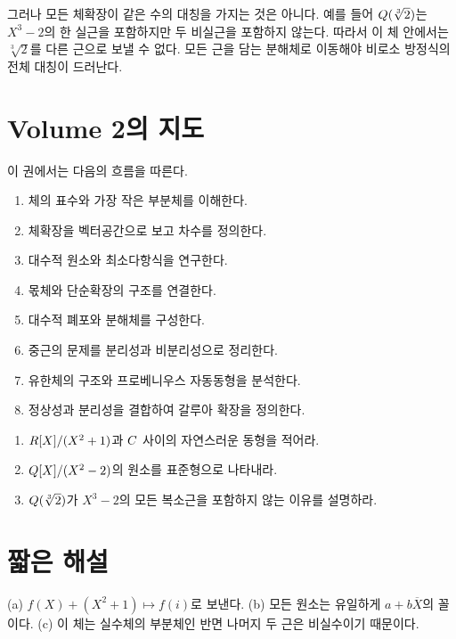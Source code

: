그러나 모든 체확장이 같은 수의 대칭을 가지는 것은 아니다. 예를 들어 $Q(\sqrt[3]{2})$는 $X^3-2$의 한 실근을 포함하지만 두 비실근을 포함하지 않는다. 따라서 이 체 안에서는 $\sqrt[3]{2}$를 다른 근으로 보낼 수 없다. 모든 근을 담는 분해체로 이동해야 비로소 방정식의 전체 대칭이 드러난다.

\section{Volume 2의 지도}

이 권에서는 다음의 흐름을 따른다.

\begin{enumerate}
  \item 체의 표수와 가장 작은 부분체를 이해한다.
  \item 체확장을 벡터공간으로 보고 차수를 정의한다.
  \item 대수적 원소와 최소다항식을 연구한다.
  \item 몫체와 단순확장의 구조를 연결한다.
  \item 대수적 폐포와 분해체를 구성한다.
  \item 중근의 문제를 분리성과 비분리성으로 정리한다.
  \item 유한체의 구조와 프로베니우스 자동동형을 분석한다.
  \item 정상성과 분리성을 결합하여 갈루아 확장을 정의한다.
\end{enumerate}

\begin{checkpoint}
\begin{enumerate}[label=(\alph*)]
  \item $R[X]/(X^2+1)$과 $C$ 사이의 자연스러운 동형을 적어라.
  \item $Q[X]/(X^2-2)$의 원소를 표준형으로 나타내라.
  \item $Q(\sqrt[3]{2})$가 $X^3-2$의 모든 복소근을 포함하지 않는 이유를 설명하라.
\end{enumerate}
\end{checkpoint}

\section*{짧은 해설}

(a) $f(X)+(X^2+1)\mapsto f(i)$로 보낸다. (b) 모든 원소는 유일하게 $a+b\overline X$의 꼴이다. (c) 이 체는 실수체의 부분체인 반면 나머지 두 근은 비실수이기 때문이다.
